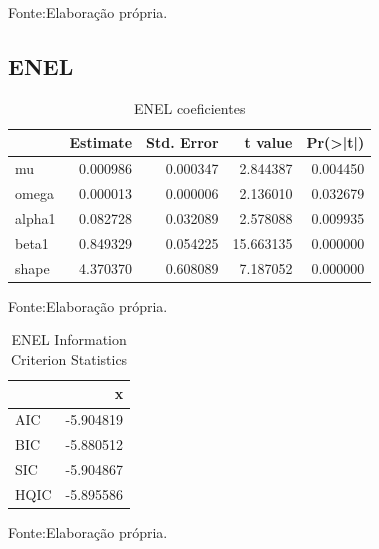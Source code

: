\documentclass[
  12pt,
  a4paper,
  openany]{book}
\begin{document}
Fonte:Elaboração própria.

\justifying
\bigskip

\hypertarget{enel}{%
\subsection{ENEL}\label{enel}}

\begin{table}[!h]

\caption{\label{tab:unnamed-chunk-25}ENEL coeficientes}
\centering
\begin{tabular}[t]{lrrrr}
\toprule
  &  Estimate &  Std. Error &  t value & Pr(>|t|)\\
\midrule
mu & 0.000986 & 0.000347 & 2.844387 & 0.004450\\
omega & 0.000013 & 0.000006 & 2.136010 & 0.032679\\
alpha1 & 0.082728 & 0.032089 & 2.578088 & 0.009935\\
beta1 & 0.849329 & 0.054225 & 15.663135 & 0.000000\\
shape & 4.370370 & 0.608089 & 7.187052 & 0.000000\\
\bottomrule
\end{tabular}
\end{table}
\FloatBarrier
\centering

Fonte:Elaboração própria.

\justifying
\bigskip

\begin{table}[!h]

\caption{\label{tab:unnamed-chunk-26}ENEL Information Criterion Statistics}
\centering
\begin{tabular}[t]{lr}
\toprule
  & x\\
\midrule
AIC & -5.904819\\
BIC & -5.880512\\
SIC & -5.904867\\
HQIC & -5.895586\\
\bottomrule
\end{tabular}
\end{table}
\FloatBarrier
\centering

Fonte:Elaboração própria.

\justifying
\bigskip
\end{document}
